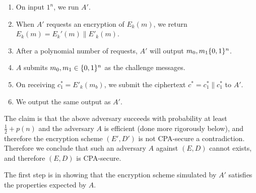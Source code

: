 \documentclass{article}
\begin{document}
\begin{enumerate}[,label=\alph*.]
\begin{mdbmarginx}{1ex}{0pt}{1ex}{0pt}
\begin{enumerate}[noitemsep,topsep=\mdcompacttopsep]%

\item{}On input $1^n$, we run $A'$.%

\item{}When $A'$ requests an encryption of $E_k(m)$, we return $E_k(m) = E_k'(m) \| E'_{k}(m)$.%

\item{}After a polynomial number of requests, $A'$ will output $m_0,m_1 \{0,1\}^n$.%

\item{}$A$ submits $m_0,m_1 \in \{0,1\}^n$ as the challenge messages.%

\item{}On receiving $c_1^* = E'_k(m_b)$, we submit the ciphertext $c^* = c_1^* \| c_1^*$ to $A'$.%

\item{}We output the same output as $A'$.%
\end{enumerate}%

\noindent{}The claim is that the above adversary succeeds with probability at least $\frac{1}{2} + p(n)$ and
the adversary $A$ is efficient (done more rigorously below), and
therefore the encryption scheme $(E',D')$ is not CPA-secure \textendash{} a contradiction. Therefore we conclude
that such an adversary $A$ against $(E,D)$ cannot exists, and therefore $(E,D)$ is CPA-secure. 
\mdfloatright{\ensuremath{\Box}}%
\end{mdbmarginx}%

The first step is in showing that the encryption scheme simulated by $A'$ satisfies the properties
expected by $A$.%


\end{enumerate}
\end{document}
